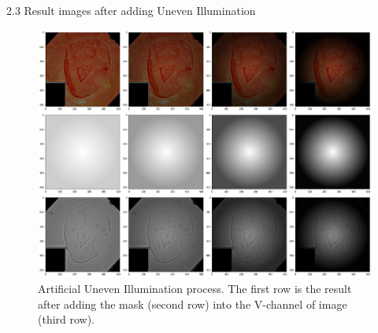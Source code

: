 \documentclass{libs/ufc_format}
\begin{document}
\begin{frame}{2.3 Result images after adding Uneven Illumination}









    \begin{figure}[h]
        \begin{center}
            \includegraphics[width=0.8\columnwidth]{libs/unevencreate.png}
            \caption{Artificial Uneven Illumination process. The first row is the result after adding the mask (second row) into the V-channel of image (third row).}
        \end{center}
    \end{figure}
\end{frame}
\end{document}
